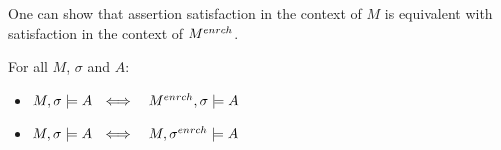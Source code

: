 \documentclass[acmsmall,review,anonymous,screen]{acmart}\settopmatter{printfolios=true,printacmref=false}
\begin{document}
{%
%
%

 One can show that assertion satisfaction in the context of $M$ is equivalent with satisfaction in the context of ${M^{enrch}}$.
 
 \begin{lemma}
 For all $M$, $\sigma$ and $A$: 
$~ $ \\
\label{lemma:equiv:}

\begin{itemize}

\item
$\satisfiesA{M}{\sigma} {A} \ \ \Longleftrightarrow \ \ \  \satisfiesA{\enrich M}{\sigma} {A} $
\item
$\satisfiesA{M}{\sigma} {A} \ \ \Longleftrightarrow \ \ \  \satisfiesA{M}{\enrich \sigma} {A} $
\end{itemize}
\end{lemma} 

}
\end{document}
